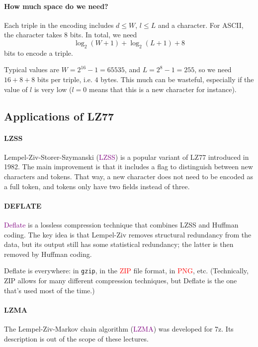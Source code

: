 \documentclass[a4paper, 11pt, openany]{book}
\numberwithin{equation}{section}
\theoremstyle{plain}
\theoremstyle{definition}
\newcommand{\Important}[1]{\textcolor{red}{#1}}
\newcommand{\Define}[1]{\textcolor{purple}{#1}}
\begin{document}
\paragraph{How much space do we need?}

Each triple in the encoding includes $d \le W$, $l \le L$ and a character. For ASCII, the character takes $8$ bits. In total, we need 
\[
    \log_2 ( W + 1 ) + \log_2 (L + 1) + 8
\]
bits to encode a triple.

Typical values are $W = 2^{16} - 1 = 65535$, and $L = 2^8 - 1 = 255$, so we need $16+8+8$ bits per triple, i.e. $4$ bytes. This much can be wasteful, especially if the value of $l$ is very low ($l=0$ means that this is a new character for instance).


\subsection{Applications of LZ77}

\paragraph{LZSS} Lempel-Ziv-Storer-Szymanski (\Define{LZSS}) is a popular variant of LZ77 introduced in 1982. The main improvement is that it includes a flag to distinguish between new characters and tokens. That way, a new character does not need to be encoded as a full token, and tokens only have two fields instead of three.

\paragraph{DEFLATE} \Define{Deflate} is a lossless compression technique that combines LZSS and Huffman coding. The key idea is that Lempel-Ziv removes structural redundancy from the data, but its output still has some statistical redundancy; the latter is then removed by Huffman coding.

Deflate is everywhere: in \texttt{gzip}, in the \Important{ZIP} file format, in \Important{PNG}, etc. (Technically, ZIP allows for many different compression techniques, but Deflate is the one that's used most of the time.)

\paragraph{LZMA} The Lempel-Ziv-Markov chain algorithm (\Define{LZMA}) was developed for 7z. Its description is out of the scope of these lectures.
\end{document}
